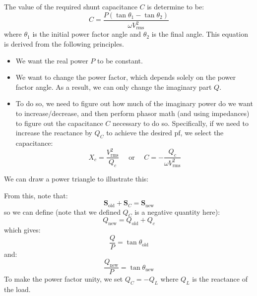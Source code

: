 \documentclass{article}
\begin{document}
The value of the required shunt capacitance $C$ is determine to be:
\begin{equation}
    C = \frac{P(\tan\theta_1-\tan\theta_2)}{\omega V_\text{rms}^2}
\end{equation}
where $\theta_1$ is the initial power factor angle and $\theta_2$ is the final angle. This equation is derived from the following principles.
\begin{itemize}
    \item We want the real power $P$ to be constant.
    \item We want to change the power factor, which depends solely on the power factor angle. As a result, we can only change the imaginary part $Q$.
    \item To do so, we need to figure out how much of the imaginary power do we want to increase/decrease, and then perform phasor math (and using impedances) to figure out the capacitance $C$ necessary to do so. Specifically, if we need to increase the reactance by $Q_C$ to achieve the desired $\text{pf}$, we select the capacitance:
    \begin{equation}
        X_c = \frac{V_\text{rms}^2}{Q_c} \quad \text{ or } \quad C = - \frac{Q_c}{\omega V_\text{rms}^2}
    \end{equation}
\end{itemize}
We can draw a power triangle to illustrate this:
\begin{center}
\end{center}
From this, note that:
\begin{equation}
    \bm{S}_\text{old} + \bm{S}_C = \bm{S}_\text{new}
\end{equation}
so we can define (note that we defined $Q_C$ is a negative quantity here):
\begin{equation}
    Q_\text{new} = Q_\text{old} + Q_c
\end{equation}
which gives:
\begin{equation}
    \frac{Q}{P} = \tan \theta_\text{old}
\end{equation}
and:
\begin{equation}
    \frac{Q_\text{new}}{P} = \tan \theta_\text{new}
\end{equation}
To make the power factor unity, we set $Q_C = -Q_L$ where $Q_L$ is the reactance of the load.
\end{document}

